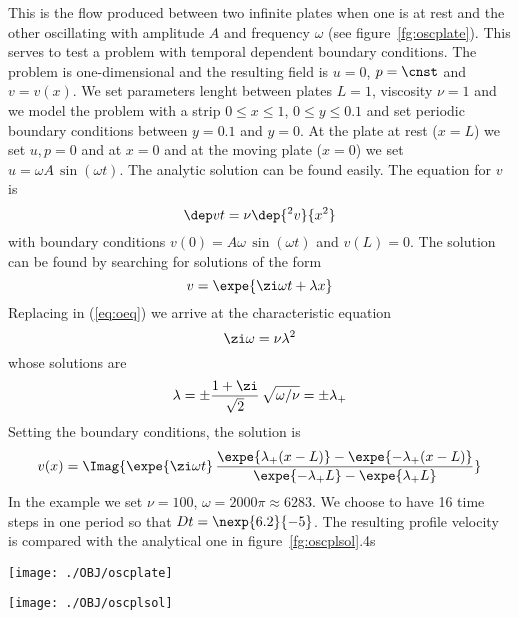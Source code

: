 This is the flow produced between two infinite plates when one is at
rest and the other oscillating with amplitude $A$ and frequency
$\omega$ (see figure~\ref{fg:oscplate}).  This serves to test a
problem with temporal dependent boundary conditions.  The problem is
one-dimensional and the resulting field is $u=0$, $p=\cnst$ and
$v=v(x)$. We set parameters lenght between plates $L=1$, viscosity
$\nu=1$ and we model the problem with a strip $0\le x \le 1$, $0\le y
\le 0.1$ and set periodic boundary conditions between $y=0.1$ and
$y=0$. At the plate at rest ($x=L$) we set $u,p=0$ and at $x=0$ and at
the moving plate ($x=0$) we set $u=\omega A \, \sin(\omega
t)$. The analytic solution can be found easily.  The
equation for $v$ is
%
\begin{equation}\label{eq:oeq}  
  \dep vt = \nu \dep {^2v}{x^2}
\end{equation}
%
with boundary conditions $v(0)=A\omega \, \sin(\omega t)$ and
$v(L)=0$. The solution can be found by searching for solutions of the
form
%
\begin{equation} 
   v = \expe{\zi\omega t+\lambda x}
\end{equation}
%
Replacing in (\ref{eq:oeq}) we arrive at the characteristic equation
%
\begin{equation} 
   \zi\omega  = \nu\lambda^2 
\end{equation}
%
whose solutions are
%
\begin{equation} 
    \lambda = \pm \frac{1+\zi}{\sqrt2} \, \sqrt{\omega/\nu} = \pm \lambda_+
\end{equation}
%
Setting the boundary conditions, the solution is
%
\begin{equation} 
   v(x) = \Imag{\expe{\zi\omega t} \, 
       \frac{ \expe{\lambda_+(x-L)} - \expe{-\lambda_+(x-L)}}
            { \expe{-\lambda_+L} - \expe{\lambda_+L}}}
\end{equation}
%
In the example we set $\nu=100$, $\omega=2000\pi\approx 6283$. We
choose to have 16 time steps in one period so that $Dt =
\nexp{6.2}{-5}$. The resulting profile velocity is compared with the
analytical one in figure~\ref{fg:oscplsol}.4s

\begin{figure*}[htb]
\centerline{\texttt{[image: ./OBJ/oscplate]}}
\caption{Oscillating plates.}
\label{fg:oscplate}
\end{figure*}
 
\begin{figure*}[htb]
\centerline{\texttt{[image: ./OBJ/oscplsol]}}
\caption{Velocity profile for the oscilating plate problem.}
\label{fg:oscplsol}
\end{figure*}


